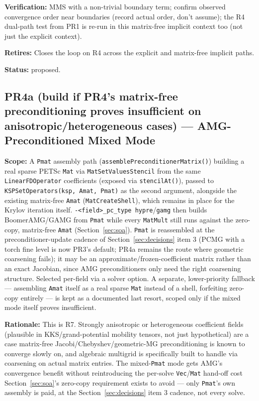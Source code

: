 \documentclass[11pt]{article}
\newcommand{\pr}[2]{\subsection{PR#1 --- #2}}
\newcommand{\status}[1]{\textcolor{marlinteal}{\textbf{Status:}} #1}
\begin{document}
\textbf{Verification:} MMS with a non-trivial boundary term; confirm
observed convergence order near boundaries (record actual order, don't
assume); the R4 dual-path test from PR1 is re-run in this matrix-free
implicit context too (not just the explicit context).

\textbf{Retires:} Closes the loop on R4 across the explicit and matrix-free
implicit paths.

\status{proposed.}

\pr{4a (build if PR4's matrix-free preconditioning proves insufficient on anisotropic/heterogeneous cases)}{AMG-Preconditioned Mixed Mode}
\textbf{Scope:} A \texttt{Pmat} assembly path
(\texttt{assemblePreconditionerMatrix()}) building a real sparse PETSc
\texttt{Mat} via \texttt{MatSetValuesStencil} from the same
\texttt{LinearFDOperator} coefficients (exposed via \texttt{stencilAt()}),
passed to \texttt{KSPSetOperators(ksp, Amat, Pmat)} as the second argument,
alongside the existing matrix-free \texttt{Amat} (\texttt{MatCreateShell}),
which remains in place for the Krylov iteration itself.
\texttt{-<field>\_pc\_type hypre}/\texttt{gamg} then builds BoomerAMG/GAMG
from \texttt{Pmat} while every \texttt{MatMult} still runs against the
zero-copy, matrix-free \texttt{Amat} (Section~\ref{sec:soa}). \texttt{Pmat}
is reassembled at the preconditioner-update cadence of
Section~\ref{sec:decisions} item 3 (PCMG with a torch fine level is now PR3's
default; PR4a remains the route where geometric coarsening fails); it may be an
approximate/frozen-coefficient matrix rather than an exact Jacobian, since
AMG preconditioners only need the right coarsening structure. Selected
per-field via a solver option. A separate, lower-priority fallback ---
assembling \texttt{Amat} itself as a real sparse \texttt{Mat} instead of a
shell, forfeiting zero-copy entirely --- is kept as a documented last
resort, scoped only if the mixed mode itself proves insufficient.

\textbf{Rationale:} This is R7. Strongly anisotropic or heterogeneous
coefficient fields (plausible in KKS/grand-potential mobility tensors, not
just hypothetical) are a case matrix-free Jacobi/Chebyshev/geometric-MG
preconditioning is known to converge slowly on, and algebraic multigrid is
specifically built to handle via coarsening on actual matrix entries. The
mixed-\texttt{Pmat} mode gets AMG's convergence benefit without
reintroducing the per-solve \texttt{Vec}/\texttt{Mat} hand-off cost
Section~\ref{sec:soa}'s zero-copy requirement exists to avoid --- only
\texttt{Pmat}'s own assembly is paid, at the Section~\ref{sec:decisions}
item 3 cadence, not every solve.
\end{document}
